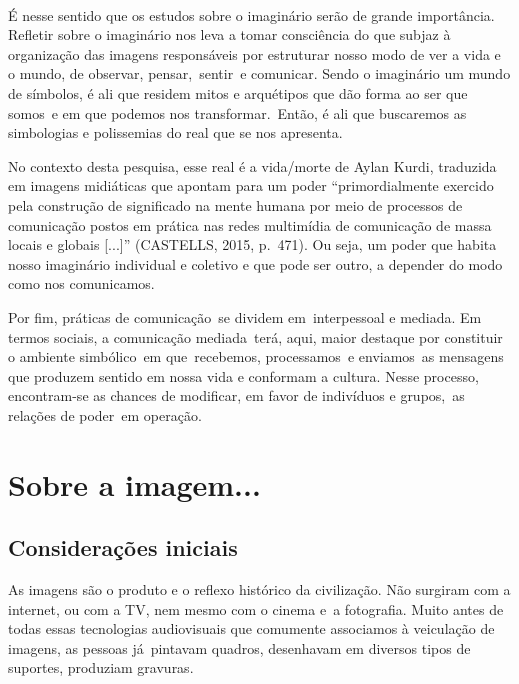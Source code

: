 \documentclass[
  letterpaper,
  a4paper,
  12pt]{scrbook}
\begin{document}
~

É nesse sentido que os estudos sobre o imaginário serão de grande
importância. Refletir sobre o imaginário nos leva a tomar consciência do
que subjaz à organização das imagens responsáveis por estruturar nosso
modo de ver a vida e o mundo, de observar, pensar,~sentir~e comunicar.
Sendo o imaginário um mundo de símbolos, é ali que residem mitos e
arquétipos que dão forma ao ser que somos~e em que podemos nos
transformar.~Então, é ali que buscaremos as simbologias e polissemias do
real que se nos apresenta.~

No contexto desta pesquisa, esse real é a vida/morte de Aylan Kurdi,
traduzida em imagens midiáticas que apontam para um poder
``primordialmente exercido pela construção de significado na mente
humana por meio de processos de comunicação postos em prática nas redes
multimídia de comunicação de massa locais e globais {[}...{]}''
(CASTELLS, 2015, p.~471). Ou seja, um poder que habita nosso imaginário
individual e coletivo e que pode ser outro, a depender do modo como nos
comunicamos.~

Por fim, práticas de comunicação~se dividem em~interpessoal e mediada.
Em termos sociais, a comunicação mediada~terá, aqui, maior destaque por
constituir o ambiente simbólico~em que~recebemos, processamos~e
enviamos~as mensagens que produzem sentido em nossa vida e conformam a
cultura. Nesse processo, encontram-se as chances de modificar, em favor
de indivíduos e grupos,~as relações de poder~em operação.~


\hypertarget{sobre-a-imagem...}{%
\chapter{Sobre a imagem...}\label{sobre-a-imagem...}}

\hypertarget{considerauxe7uxf5es-iniciais}{%
\section{Considerações iniciais}\label{considerauxe7uxf5es-iniciais}}

As imagens são o produto e o reflexo histórico da civilização. Não
surgiram com a internet, ou com a TV, nem mesmo com o cinema e~a
fotografia. Muito antes de todas essas tecnologias audiovisuais que
comumente associamos à veiculação de imagens, as pessoas já~pintavam
quadros, desenhavam em diversos tipos de suportes, produziam gravuras.
\end{document}
